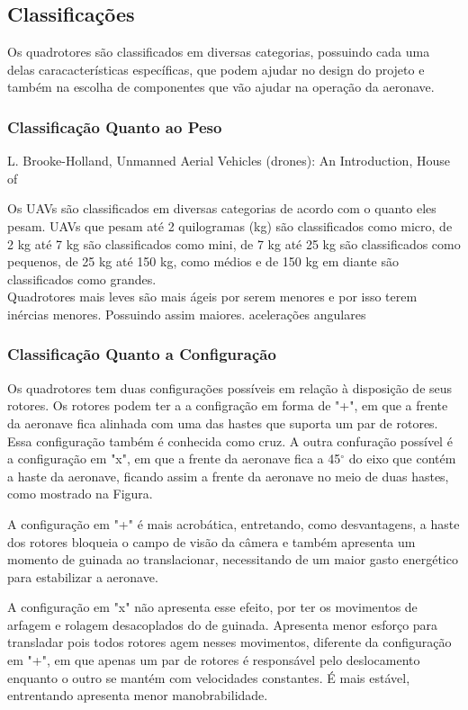\subsection{Classificações}
Os quadrotores são classificados em diversas categorias, possuindo cada uma delas caracacterísticas específicas, que podem ajudar no design do projeto e também na escolha de componentes que vão ajudar na operação da aeronave.

\subsubsection{Classificação Quanto ao Peso}
L. Brooke-Holland, Unmanned Aerial Vehicles (drones): An Introduction, House of

Os UAVs são classificados em diversas categorias de acordo com o quanto eles pesam. UAVs que pesam até 2 quilogramas (kg) são classificados como micro, de 2 kg até 7 kg são classificados como mini, de 7 kg até 25 kg são classificados como pequenos, de 25 kg até 150 kg, como médios e de 150 kg em diante são classificados como grandes.\\
Quadrotores mais leves são mais ágeis por serem menores e por isso terem inércias menores. Possuindo assim maiores. acelerações angulares 

\subsubsection{Classificação Quanto a Configuração}
Os quadrotores tem duas configurações possíveis em relação à disposição de seus rotores. Os rotores podem ter a a configração em forma de "+", em que a frente da aeronave fica alinhada com uma das hastes que suporta um par de rotores. Essa configuração também é conhecida como cruz. A outra confuração possível é a configuração em "x", em que a frente da aeronave fica a 45$^{\circ}$ do eixo que contém a haste da aeronave, ficando assim a frente da aeronave no meio de duas hastes, como mostrado na Figura.

A configuração em "+" é mais acrobática, entretando, como desvantagens, a haste dos rotores bloqueia o campo de visão da câmera e também apresenta um momento de guinada ao translacionar, necessitando de um maior gasto energético para estabilizar a aeronave.

A configuração em "x" não apresenta esse efeito, por ter os movimentos de arfagem e rolagem desacoplados do de guinada. Apresenta menor esforço para transladar pois todos rotores agem nesses movimentos, diferente da configuração em "+", em que apenas um par de rotores é responsável pelo deslocamento enquanto o outro se mantém com velocidades constantes. É mais estável, entrentando apresenta menor manobrabilidade.


